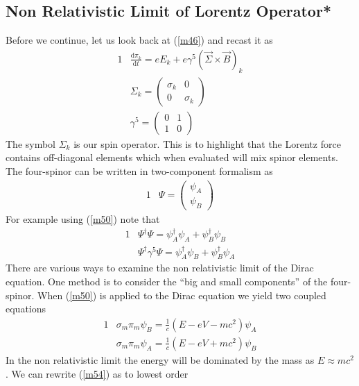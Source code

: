 \documentclass[]{article}
\numberwithin{equation}{subsection}
\begin{document}
\subsection{Non Relativistic Limit of Lorentz Operator*}
Before we continue, let us look back at (\ref{m46}) and recast it as
\begin{alignat}{1}
  \label{m47}		&\frac{\mathrm{d}\pi_{k}}{\mathrm{d}t}=e E_{k}+e\gamma^{5}(\vec{\Sigma}\times\vec{B})_{k}\\
  \label{m48}		&\Sigma_{k}=
  \begin{pmatrix}
    \sigma_{k}&0\\
    0&\sigma_{k}
  \end{pmatrix}\\
  \label{m49}		&\gamma^{5}=
  \begin{pmatrix}
    0&1\\
    1&0
  \end{pmatrix}
\end{alignat}
The symbol $\Sigma_{k}$ is our spin operator. This is to highlight that the Lorentz force contains off-diagonal elements which when evaluated will mix spinor elements. The four-spinor can be written in two-component formalism as
\begin{alignat}{1}
  \label{m50}		&\Psi=
  \begin{pmatrix}
    \psi_{A}\\
    \psi_{B}
  \end{pmatrix}
\end{alignat}
 For example using (\ref{m50}) note that
\begin{alignat}{1}
  \label{m51}		&\Psi^{\dagger}\Psi=\psi^{\dagger}_{A}\psi_{A}+\psi^{\dagger}_{B}\psi_{B}\\
  \label{m52}		&\Psi^{\dagger}\gamma^{5}\Psi=\psi^{\dagger}_{A}\psi_{B}+\psi^{\dagger}_{B}\psi_{A}
\end{alignat}
There are various ways to examine the non relativistic limit of the Dirac equation. One method is to consider the ``big and small components'' of the four-spinor. When (\ref{m50}) is applied to the Dirac equation we yield two coupled equations
\begin{alignat}{1}
  \label{m53}		&\sigma_{m}\pi_{m}\psi_{B}=\frac{1}{c}(E-eV-mc^{2})\psi_{A}\\
  \label{m54}		&\sigma_{m}\pi_{m}\psi_{A}=\frac{1}{c}(E-eV+mc^{2})\psi_{B}
\end{alignat}
In the non relativistic limit the energy will be dominated by the mass as $E\approx mc^{2}$. We can rewrite (\ref{m54}) as to lowest order
\end{document}
